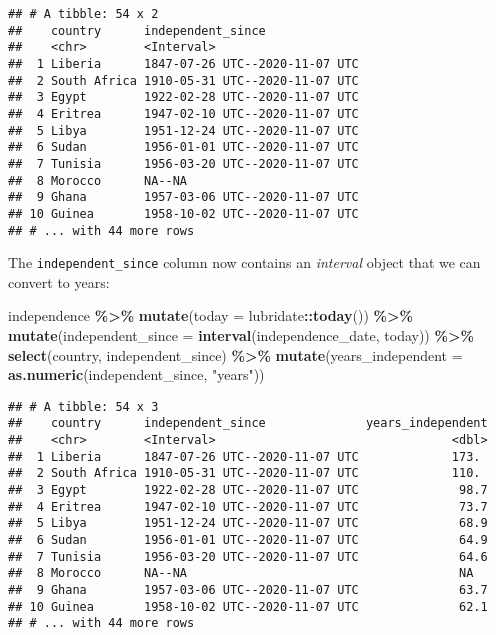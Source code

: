 \documentclass[
]{article}
\newenvironment{Shaded}{\begin{snugshade}}{\end{snugshade}}
\newcommand{\DataTypeTok}[1]{\textcolor[rgb]{0.13,0.29,0.53}{#1}}
\newcommand{\KeywordTok}[1]{\textcolor[rgb]{0.13,0.29,0.53}{\textbf{#1}}}
\newcommand{\NormalTok}[1]{#1}
\newcommand{\OperatorTok}[1]{\textcolor[rgb]{0.81,0.36,0.00}{\textbf{#1}}}
\newcommand{\StringTok}[1]{\textcolor[rgb]{0.31,0.60,0.02}{#1}}
\begin{document}
\begin{verbatim}
## # A tibble: 54 x 2
##    country      independent_since             
##    <chr>        <Interval>                    
##  1 Liberia      1847-07-26 UTC--2020-11-07 UTC
##  2 South Africa 1910-05-31 UTC--2020-11-07 UTC
##  3 Egypt        1922-02-28 UTC--2020-11-07 UTC
##  4 Eritrea      1947-02-10 UTC--2020-11-07 UTC
##  5 Libya        1951-12-24 UTC--2020-11-07 UTC
##  6 Sudan        1956-01-01 UTC--2020-11-07 UTC
##  7 Tunisia      1956-03-20 UTC--2020-11-07 UTC
##  8 Morocco      NA--NA                        
##  9 Ghana        1957-03-06 UTC--2020-11-07 UTC
## 10 Guinea       1958-10-02 UTC--2020-11-07 UTC
## # ... with 44 more rows
\end{verbatim}

The \texttt{independent\_since} column now contains an \emph{interval} object that we can convert to years:

\begin{Shaded}
\begin{Highlighting}[]
\NormalTok{independence }\OperatorTok{\%\textgreater{}\%}
\StringTok{  }\KeywordTok{mutate}\NormalTok{(}\DataTypeTok{today =}\NormalTok{ lubridate}\OperatorTok{::}\KeywordTok{today}\NormalTok{()) }\OperatorTok{\%\textgreater{}\%}
\StringTok{  }\KeywordTok{mutate}\NormalTok{(}\DataTypeTok{independent\_since =} \KeywordTok{interval}\NormalTok{(independence\_date, today)) }\OperatorTok{\%\textgreater{}\%}
\StringTok{  }\KeywordTok{select}\NormalTok{(country, independent\_since) }\OperatorTok{\%\textgreater{}\%}
\StringTok{  }\KeywordTok{mutate}\NormalTok{(}\DataTypeTok{years\_independent =} \KeywordTok{as.numeric}\NormalTok{(independent\_since, }\StringTok{"years"}\NormalTok{))}
\end{Highlighting}
\end{Shaded}

\begin{verbatim}
## # A tibble: 54 x 3
##    country      independent_since              years_independent
##    <chr>        <Interval>                                 <dbl>
##  1 Liberia      1847-07-26 UTC--2020-11-07 UTC             173. 
##  2 South Africa 1910-05-31 UTC--2020-11-07 UTC             110. 
##  3 Egypt        1922-02-28 UTC--2020-11-07 UTC              98.7
##  4 Eritrea      1947-02-10 UTC--2020-11-07 UTC              73.7
##  5 Libya        1951-12-24 UTC--2020-11-07 UTC              68.9
##  6 Sudan        1956-01-01 UTC--2020-11-07 UTC              64.9
##  7 Tunisia      1956-03-20 UTC--2020-11-07 UTC              64.6
##  8 Morocco      NA--NA                                      NA  
##  9 Ghana        1957-03-06 UTC--2020-11-07 UTC              63.7
## 10 Guinea       1958-10-02 UTC--2020-11-07 UTC              62.1
## # ... with 44 more rows
\end{verbatim}
\end{document}
